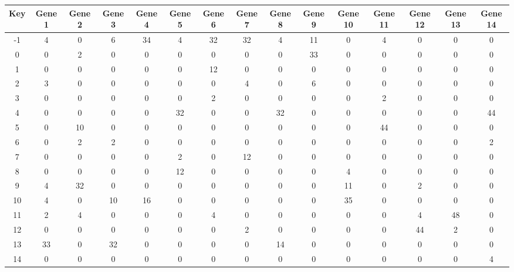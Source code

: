 \begin{tabular}{|c|c|c|c|c|c|c|c|c|c|c|c|c|c|c|}
\hline
Key & Gene 1 & Gene 2 & Gene 3 & Gene 4 & Gene 5 & Gene 6 & Gene 7 & Gene 8 & Gene 9 & Gene 10 & Gene 11 & Gene 12 & Gene 13 & Gene 14 \\
\hline
-1 & 4 & 0 & 6 & 34 & 4 & 32 & 32 & 4 & 11 & 0 & 4 & 0 & 0 & 0 \\
0 & 0 & 2 & 0 & 0 & 0 & 0 & 0 & 0 & 33 & 0 & 0 & 0 & 0 & 0 \\
1 & 0 & 0 & 0 & 0 & 0 & 12 & 0 & 0 & 0 & 0 & 0 & 0 & 0 & 0 \\
2 & 3 & 0 & 0 & 0 & 0 & 0 & 4 & 0 & 6 & 0 & 0 & 0 & 0 & 0 \\
3 & 0 & 0 & 0 & 0 & 0 & 2 & 0 & 0 & 0 & 0 & 2 & 0 & 0 & 0 \\
4 & 0 & 0 & 0 & 0 & 32 & 0 & 0 & 32 & 0 & 0 & 0 & 0 & 0 & 44 \\
5 & 0 & 10 & 0 & 0 & 0 & 0 & 0 & 0 & 0 & 0 & 44 & 0 & 0 & 0 \\
6 & 0 & 2 & 2 & 0 & 0 & 0 & 0 & 0 & 0 & 0 & 0 & 0 & 0 & 2 \\
7 & 0 & 0 & 0 & 0 & 2 & 0 & 12 & 0 & 0 & 0 & 0 & 0 & 0 & 0 \\
8 & 0 & 0 & 0 & 0 & 12 & 0 & 0 & 0 & 0 & 4 & 0 & 0 & 0 & 0 \\
9 & 4 & 32 & 0 & 0 & 0 & 0 & 0 & 0 & 0 & 11 & 0 & 2 & 0 & 0 \\
10 & 4 & 0 & 10 & 16 & 0 & 0 & 0 & 0 & 0 & 35 & 0 & 0 & 0 & 0 \\
11 & 2 & 4 & 0 & 0 & 0 & 4 & 0 & 0 & 0 & 0 & 0 & 4 & 48 & 0 \\
12 & 0 & 0 & 0 & 0 & 0 & 0 & 2 & 0 & 0 & 0 & 0 & 44 & 2 & 0 \\
13 & 33 & 0 & 32 & 0 & 0 & 0 & 0 & 14 & 0 & 0 & 0 & 0 & 0 & 0 \\
14 & 0 & 0 & 0 & 0 & 0 & 0 & 0 & 0 & 0 & 0 & 0 & 0 & 0 & 4 \\
\hline
\end{tabular}